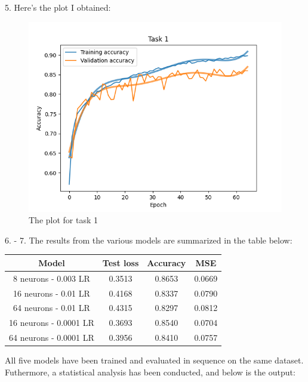 \documentclass[11pt]{scrartcl}
\begin{document}
	5. Here's the plot I obtained:

	\begin{figure}[H]
		\centering
		\includegraphics[width=\textwidth]{src/plot_task1.png}
		\caption{The plot for task 1}
		\label{fig:plot_T1}
	\end{figure}

	6. - 7. The results from the various models are summarized in the table below:\\
	
	\begin{table}[H]
		\centering
		\begin{tabular}{cccc}
			Model & Test loss & Accuracy & MSE\\
			\hline
			8 neurons - 0.003 LR & 0.3513 & 0.8653 & 0.0669\\
			16 neurons - 0.01 LR & 0.4168 & 0.8337 & 0.0790\\
			64 neurons - 0.01 LR & 0.4315 & 0.8297 & 0.0812\\
			16 neurons - 0.0001 LR & 0.3693 & 0.8540 & 0.0704\\
			64 neurons - 0.0001 LR & 0.3956 & 0.8410 & 0.0757
		\end{tabular}
	\end{table}

	All five models have been trained and evaluated in sequence on the same dataset.\\
	
	\newpage
	Futhermore, a statistical analysis has been conducted, and below is the output:\\
\end{document}

